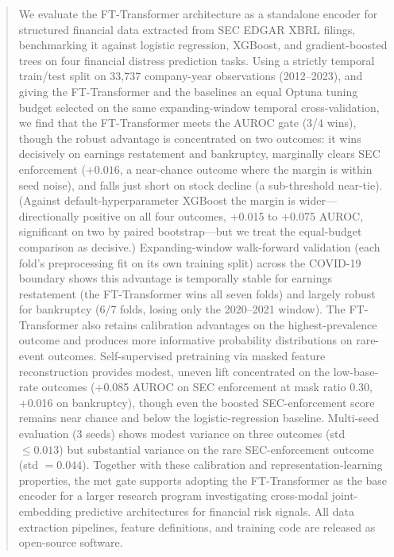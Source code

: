 \begin{abstract}
We evaluate the FT-Transformer architecture as a standalone encoder for structured financial data extracted from SEC EDGAR XBRL filings, benchmarking it against logistic regression, XGBoost, and gradient-boosted trees on four financial distress prediction tasks. Using a strictly temporal train/test split on 33{,}737 company-year observations (2012--2023), and giving the FT-Transformer and the baselines an equal Optuna tuning budget selected on the same expanding-window temporal cross-validation, we find that the FT-Transformer meets the AUROC gate (3/4 wins), though the robust advantage is concentrated on two outcomes: it wins decisively on earnings restatement and bankruptcy, marginally clears SEC enforcement ($+0.016$, a near-chance outcome where the margin is within seed noise), and falls just short on stock decline (a sub-threshold near-tie). (Against default-hyperparameter XGBoost the margin is wider---directionally positive on all four outcomes, +0.015 to +0.075 AUROC, significant on two by paired bootstrap---but we treat the equal-budget comparison as decisive.) Expanding-window walk-forward validation (each fold's preprocessing fit on its own training split) across the COVID-19 boundary shows this advantage is temporally stable for earnings restatement (the FT-Transformer wins all seven folds) and largely robust for bankruptcy (6/7 folds, losing only the 2020--2021 window). The FT-Transformer also retains calibration advantages on the highest-prevalence outcome and produces more informative probability distributions on rare-event outcomes. Self-supervised pretraining via masked feature reconstruction provides modest, uneven lift concentrated on the low-base-rate outcomes (+0.085 AUROC on SEC enforcement at mask ratio 0.30, +0.016 on bankruptcy), though even the boosted SEC-enforcement score remains near chance and below the logistic-regression baseline. Multi-seed evaluation (3 seeds) shows modest variance on three outcomes (std $\leq 0.013$) but substantial variance on the rare SEC-enforcement outcome (std $= 0.044$). Together with these calibration and representation-learning properties, the met gate supports adopting the FT-Transformer as the base encoder for a larger research program investigating cross-modal joint-embedding predictive architectures for financial risk signals. All data extraction pipelines, feature definitions, and training code are released as open-source software.
\end{abstract}
